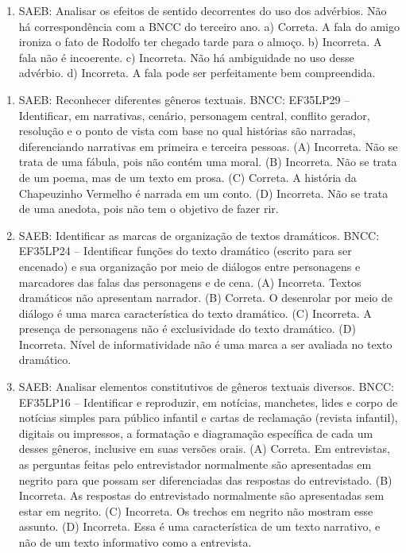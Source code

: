 \begin{enumerate}
\item
SAEB: Analisar os efeitos de sentido decorrentes do uso dos advérbios. Não há correspondência com a BNCC do terceiro ano. a) Correta. A fala do amigo ironiza o fato de Rodolfo ter chegado tarde para o almoço. b) Incorreta. A fala não é incoerente. c) Incorreta. Não há ambiguidade no uso desse advérbio. d) Incorreta. A fala pode ser perfeitamente bem compreendida.
\end{enumerate}


\begin{enumerate}
\item
SAEB: Reconhecer diferentes gêneros textuais.
BNCC: EF35LP29 -- Identificar, em narrativas, cenário, personagem central,
conflito gerador, resolução e o ponto de vista com base no qual
histórias são narradas, diferenciando narrativas em primeira e terceira
pessoas.
(A) Incorreta. Não se trata de uma fábula, pois não contém uma moral.
(B) Incorreta. Não se trata de um poema, mas de um texto em prosa.
(C) Correta. A história da Chapeuzinho Vermelho é narrada em um conto.
(D) Incorreta. Não se trata de uma anedota, pois não tem o objetivo de fazer rir.

\item
SAEB: Identificar as marcas de organização de textos dramáticos.
BNCC: EF35LP24 -- Identificar funções do texto dramático (escrito para ser encenado) e sua organização
por meio de diálogos entre personagens e marcadores das falas das personagens e de cena.
(A) Incorreta. Textos dramáticos não apresentam narrador.
(B) Correta. O desenrolar por meio de diálogo é uma marca característica do texto dramático.
(C) Incorreta. A presença de personagens não é exclusividade do texto dramático.
(D) Incorreta. Nível de informatividade não é uma marca a ser avaliada no texto dramático.

\item
SAEB: Analisar elementos constitutivos de gêneros textuais diversos.
BNCC: EF35LP16 -- Identificar e reproduzir, em notícias, manchetes, lides e
corpo de notícias simples para público infantil e cartas de reclamação
(revista infantil), digitais ou impressos, a formatação e diagramação
específica de cada um desses gêneros, inclusive em suas versões orais.
(A) Correta. Em entrevistas, as perguntas feitas pelo entrevistador
normalmente são apresentadas em negrito para que possam ser
diferenciadas das respostas do entrevistado.
(B) Incorreta. As respostas do entrevistado normalmente são apresentadas
sem estar em negrito.
(C) Incorreta. Os trechos em negrito não mostram esse assunto.
(D) Incorreta. Essa é uma característica de um texto narrativo, e não de
um texto informativo como a entrevista.


\end{enumerate}
